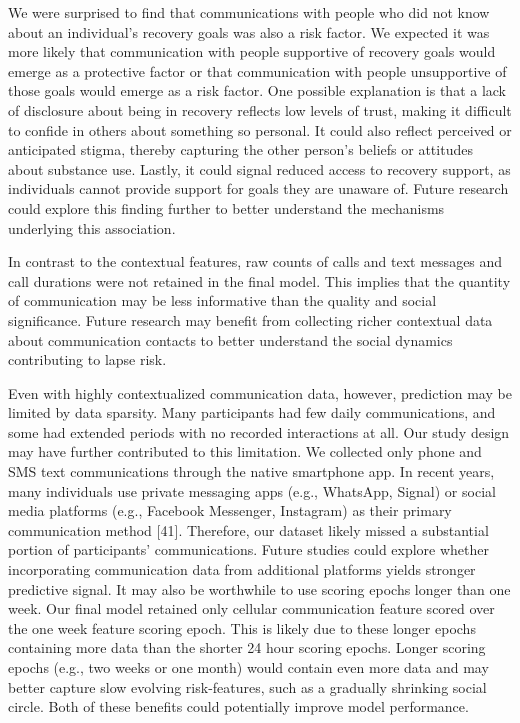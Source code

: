 \documentclass[
  letterpaper,
  DIV=11,
  numbers=noendperiod]{scrartcl}
\begin{document}
We were surprised to find that communications with people who did not
know about an individual's recovery goals was also a risk factor. We
expected it was more likely that communication with people supportive of
recovery goals would emerge as a protective factor or that communication
with people unsupportive of those goals would emerge as a risk factor.
One possible explanation is that a lack of disclosure about being in
recovery reflects low levels of trust, making it difficult to confide in
others about something so personal. It could also reflect perceived or
anticipated stigma, thereby capturing the other person's beliefs or
attitudes about substance use. Lastly, it could signal reduced access to
recovery support, as individuals cannot provide support for goals they
are unaware of. Future research could explore this finding further to
better understand the mechanisms underlying this association.

In contrast to the contextual features, raw counts of calls and text
messages and call durations were not retained in the final model. This
implies that the quantity of communication may be less informative than
the quality and social significance. Future research may benefit from
collecting richer contextual data about communication contacts to better
understand the social dynamics contributing to lapse risk.

Even with highly contextualized communication data, however, prediction
may be limited by data sparsity. Many participants had few daily
communications, and some had extended periods with no recorded
interactions at all. Our study design may have further contributed to
this limitation. We collected only phone and SMS text communications
through the native smartphone app. In recent years, many individuals use
private messaging apps (e.g., WhatsApp, Signal) or social media
platforms (e.g., Facebook Messenger, Instagram) as their primary
communication method {[}41{]}. Therefore, our dataset likely missed a
substantial portion of participants' communications. Future studies
could explore whether incorporating communication data from additional
platforms yields stronger predictive signal. It may also be worthwhile
to use scoring epochs longer than one week. Our final model retained
only cellular communication feature scored over the one week feature
scoring epoch. This is likely due to these longer epochs containing more
data than the shorter 24 hour scoring epochs. Longer scoring epochs
(e.g., two weeks or one month) would contain even more data and may
better capture slow evolving risk-features, such as a gradually
shrinking social circle. Both of these benefits could potentially
improve model performance.
\end{document}
